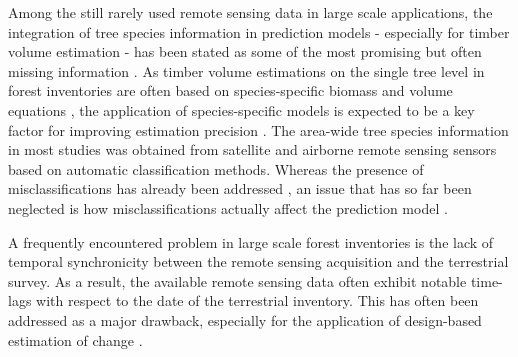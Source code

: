 Among the still rarely used remote sensing data in large scale applications, the integration of tree species information in prediction models - especially for timber volume estimation - has been stated as some of the most promising but often missing information \citep{koch2010, white2016}. As timber volume estimations on the single tree level in forest inventories are often based on species-specific biomass and volume equations \citep{husmann2017,zianis2005}, the application of species-specific models is expected to be a key factor for improving estimation precision \citep{white2016}.  The area-wide tree species information in most studies was obtained from satellite and airborne remote sensing sensors based on automatic classification methods. Whereas the presence of misclassifications has already been addressed \citep{latifi2012}, an issue that has so far been neglected is how misclassifications actually affect the prediction model \citep{gustafson2003}.\par

A frequently encountered problem in large scale forest inventories is the lack of temporal synchronicity between the remote sensing acquisition and the terrestrial survey. As a result, the available remote sensing data often exhibit notable time-lags with respect to the date of the terrestrial inventory. This has often been addressed as a major drawback, especially for the application of design-based estimation of change \citep{massey2015b}.\par

